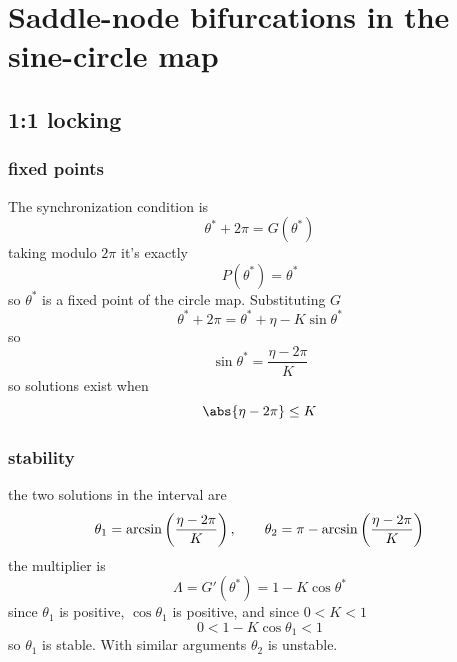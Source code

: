 \clearpage
\section{Saddle-node bifurcations in the sine-circle map}
\subsection{1:1 locking}
\subsubsection{fixed points}
The synchronization condition is 
\begin{equation}
    \theta^*+2\pi=G(\theta^*)
\end{equation}
taking modulo \(2\pi\) it's exactly
\begin{equation}
    P(\theta^*)=\theta^*
\end{equation}
so \(\theta^*\) is a fixed point of the circle map. Substituting \(G\)
\begin{equation}
    \theta^*+2\pi=\theta^*+\eta-K\sin\theta^*
\end{equation}
so 
\begin{equation}
    \sin\theta^*=\frac{\eta-2\pi}{K}
\end{equation}
so solutions exist when 
\begin{equation}
    \abs{\eta-2\pi}\leq K
\end{equation}
\subsubsection{stability}
the two solutions in the interval are 
\begin{equation}
    \theta_1=\arcsin\left(\frac{\eta-2\pi}{K}\right),\qquad\theta_2=\pi-\arcsin\left(\frac{\eta-2\pi}{K}\right)
\end{equation}
the multiplier is 
\begin{equation}
    \Lambda = G'(\theta^*)=1-K\cos\theta^*
\end{equation}
since \(\theta_1\) is positive, \(\cos\theta_1\) is positive, and since \(0<K<1\)
\begin{equation}
    0<1-K\cos\theta_1<1
\end{equation}
so \(\theta_1\) is stable. With similar arguments \(\theta_2\) is unstable.
